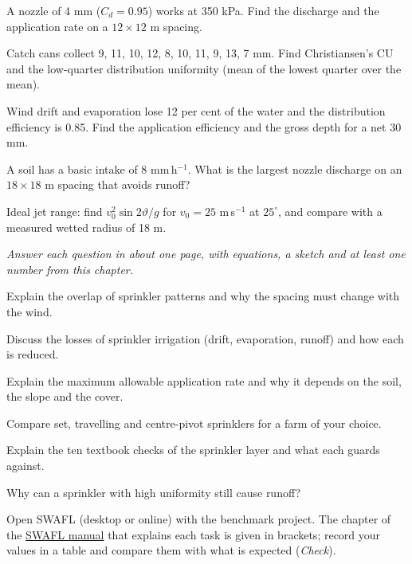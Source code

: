 \begin{exlist}
\item A nozzle of 4 mm ($C_d=0.95$) works at 350 kPa. Find the discharge and the application rate on a $12\times12$ m spacing.
\item Catch cans collect 9, 11, 10, 12, 8, 10, 11, 9, 13, 7 mm. Find Christiansen's CU and the low-quarter distribution uniformity (mean of the lowest quarter over the mean).
\item Wind drift and evaporation lose 12 per cent of the water and the distribution efficiency is 0.85. Find the application efficiency and the gross depth for a net 30 mm.
\item A soil has a basic intake of 8 mm\,h$^{-1}$. What is the largest nozzle discharge on an $18\times18$ m spacing that avoids runoff?
\item Ideal jet range: find $v_0^2\sin2\vartheta/g$ for $v_0=25$ m\,s$^{-1}$ at $25^\circ$, and compare with a measured wetted radius of 18 m.
\end{exlist}
{\small\itshape Answer each question in about one page, with equations, a sketch and at least one number from this chapter.}\par\vspace{3pt}
\begin{exlist}
\item Explain the overlap of sprinkler patterns and why the spacing must change with the wind.
\item Discuss the losses of sprinkler irrigation (drift, evaporation, runoff) and how each is reduced.
\item Explain the maximum allowable application rate and why it depends on the soil, the slope and the cover.
\item Compare set, travelling and centre-pivot sprinklers for a farm of your choice.
\item Explain the ten textbook checks of the sprinkler layer and what each guards against.
\item Why can a sprinkler with high uniformity still cause runoff?
\end{exlist}
{\small Open SWAFL (desktop or online) with the benchmark project. The chapter of the \href{https://github.com/halilunaziru73-creator/Coupled-Water-Fluxes-Pore-Scale-Dynamics-Precision-Irrigation-Mulching-Feedback-Loops/raw/main/Software/v1.1.0/SWAFL_Desktop/docs/manual_v1.1.0/SWAFL_Manual_v1.1.0.pdf}{SWAFL manual} that explains each task is given in brackets; record your values in a table and compare them with what is expected (\emph{Check}).}\par\vspace{3pt}
